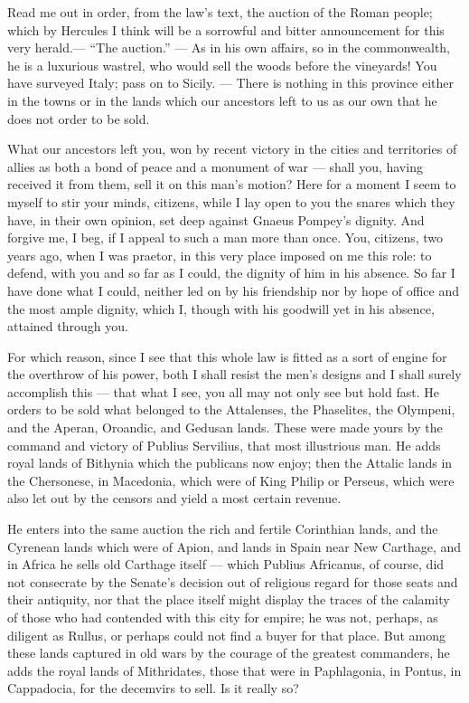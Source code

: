  Read me out in order, from the law's text, the auction of the Roman people; which by Hercules I think will be a sorrowful and bitter announcement for this very herald.--- ``The auction.'' --- As in his own affairs, so in the commonwealth, he is a luxurious wastrel, who would sell the woods before the vineyards! You have surveyed Italy; pass on to Sicily. --- There is nothing in this province either in the towns or in the lands which our ancestors left to us as our own that he does not order to be sold.

 What our ancestors left you, won by recent victory in the cities and territories of allies as both a bond of peace and a monument of war --- shall you, having received it from them, sell it on this man's motion? Here for a moment I seem to myself to stir your minds, citizens, while I lay open to you the snares which they have, in their own opinion, set deep against Gnaeus Pompey's dignity. And forgive me, I beg, if I appeal to such a man more than once. You, citizens, two years ago, when I was praetor, in this very place imposed on me this role: to defend, with you and so far as I could, the dignity of him in his absence. So far I have done what I could, neither led on by his friendship nor by hope of office and the most ample dignity, which I, though with his goodwill yet in his absence, attained through you.

 For which reason, since I see that this whole law is fitted as a sort of engine for the overthrow of his power, both I shall resist the men's designs and I shall surely accomplish this --- that what I see, you all may not only see but hold fast. He orders to be sold what belonged to the Attalenses, the Phaselites, the Olympeni, and the Aperan, Oroandic, and Gedusan lands. These were made yours by the command and victory of Publius Servilius, that most illustrious man. He adds royal lands of Bithynia which the publicans now enjoy; then the Attalic lands in the Chersonese, in Macedonia, which were of King Philip or Perseus, which were also let out by the censors and yield a most certain revenue.

 He enters into the same auction the rich and fertile Corinthian lands, and the Cyrenean lands which were of Apion, and lands in Spain near New Carthage, and in Africa he sells old Carthage itself --- which Publius Africanus, of course, did not consecrate by the Senate's decision out of religious regard for those seats and their antiquity, nor that the place itself might display the traces of the calamity of those who had contended with this city for empire; he was not, perhaps, as diligent as Rullus, or perhaps could not find a buyer for that place. But among these lands captured in old wars by the courage of the greatest commanders, he adds the royal lands of Mithridates, those that were in Paphlagonia, in Pontus, in Cappadocia, for the decemvirs to sell. Is it really so?


